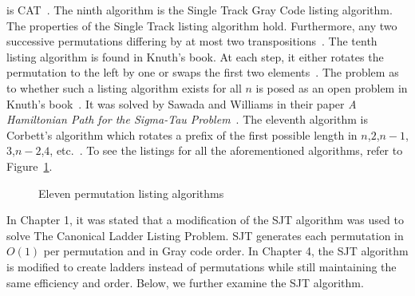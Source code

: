 is CAT~\cite{A36}.
The ninth algorithm is the Single Track Gray Code listing algorithm. The properties of the Single Track 
listing algorithm hold. Furthermore, any two successive permutations differing by at most two transpositions~\cite{A36}.
The tenth listing algorithm is found in Knuth's book. At each step, it either rotates the permutation to the left by one 
or swaps the first two elements~\cite{A37}. The problem as to whether such a listing algorithm exists for all $n$ 
is posed as an open problem in Knuth's book~\cite{A37}. It was solved by Sawada and Williams in their paper 
\emph{A Hamiltonian Path for the Sigma-Tau Problem}~\cite{A38}.
The eleventh algorithm is Corbett's algorithm which rotates a prefix of the first possible length in 
$n$,$2$,$n-1$,$3$,$n-2$,$4$, etc.~\cite{A34}. 
To see the listings for all the aforementioned algorithms, refer to Figure~\ref{Fig:11perms}\cite{A42}.\par
\begin{figure} 
    \centering 
    \caption{Eleven permutation listing algorithms}
    \label{Fig:11perms}
\end{figure}

In Chapter 1, it was stated that a modification of the SJT algorithm was used to solve The Canonical Ladder Listing Problem. 
SJT generates each permutation in $O(1)$ per permutation and in Gray code order. In Chapter 4, the SJT 
algorithm is modified to create ladders instead of permutations while still maintaining the same efficiency and order. 
Below, we further examine the SJT algorithm.

